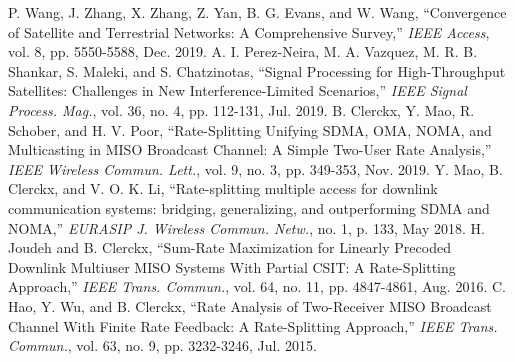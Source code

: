 \documentclass[draftclsnofoot, onecolumn, comsoc, 12pt]{IEEEtran}
\begin{document}
\ifCLASSOPTIONcaptionsoff
  \newpage
\fi

\begin{thebibliography}{1}
 \label{ref:Access_Survey}
P. Wang, J. Zhang, X. Zhang, Z. Yan, B. G. Evans, and W. Wang,  ``Convergence of Satellite and Terrestrial Networks: A Comprehensive Survey,''  \emph{IEEE Access}, vol. 8, pp. 5550-5588, Dec. 2019.
 \label{ref:Magazine_Signal Processing for HTS}
A. I. Perez-Neira, M. A. Vazquez, M. R. B. Shankar, S. Maleki, and
S. Chatzinotas, ``Signal Processing for High-Throughput Satellites:
Challenges in New Interference-Limited Scenarios,''  \emph{IEEE Signal Process. Mag.}, vol. 36, no. 4, pp. 112-131, Jul. 2019.
 \label{ref:2019 Letter_Bruno_RSMA}
B. Clerckx, Y. Mao, R. Schober, and H. V. Poor, ``Rate-Splitting Unifying SDMA, OMA, NOMA, and Multicasting in MISO Broadcast Channel: A Simple Two-User Rate Analysis,''  \emph{IEEE Wireless Commun. Lett.}, vol. 9, no. 3, pp. 349-353, Nov. 2019.
 \label{ref:2018 EURASIP_Bruno_RSMA}
Y. Mao, B. Clerckx, and V. O. K. Li, ``Rate-splitting multiple access for downlink communication systems: bridging,
generalizing, and outperforming SDMA and NOMA,'' \emph{EURASIP J. Wireless Commun. Netw.}, no. 1, p. 133, May 2018.
 \label{ref:2016 TCOM_Bruno_RSMA imperfect CSIT}
H. Joudeh and B. Clerckx, ``Sum-Rate Maximization for Linearly Precoded Downlink Multiuser MISO Systems With Partial CSIT: A Rate-Splitting Approach,''  \emph{IEEE Trans. Commun.}, vol. 64, no. 11, pp. 4847-4861, Aug. 2016.
 \label{ref:2015 TCOM_Bruno_RSMA imperfect CSIT}
C. Hao, Y. Wu, and B. Clerckx, ``Rate Analysis of Two-Receiver MISO Broadcast Channel With Finite Rate Feedback: A Rate-Splitting Approach,''  \emph{IEEE Trans. Commun.}, vol. 63, no. 9, pp. 3232-3246, Jul. 2015.

\end{thebibliography}
\end{document}
